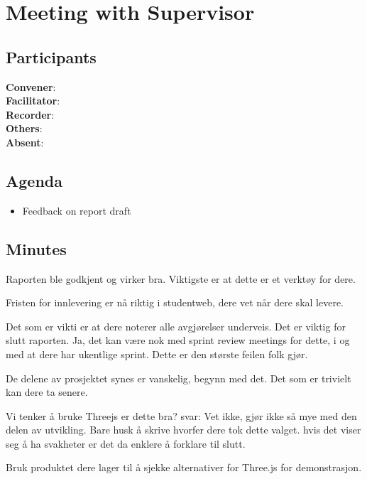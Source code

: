 \section*{Meeting with Supervisor}

\subsection*{Participants}

\textbf{Convener}: \supervisor{}\\
\textbf{Facilitator}: \facilitator{}  \\
\textbf{Recorder}: \scrummaster{}  \\
\textbf{Others}: \groupleader{}                          \\
\textbf{Absent}: 

\subsection*{Agenda}
\begin{itemize}
    \item Feedback on report draft

\end{itemize}

\subsection*{Minutes}
Raporten ble godkjent og virker bra.
Viktigste er at dette  er et verktøy for dere.

Fristen for innlevering er nå riktig i studentweb, dere vet når dere skal levere.


Det som er vikti er at dere noterer alle avgjørelser underveis. Det er viktig for slutt raporten. Ja, det kan være nok med sprint review meetings for dette, i og med at dere har ukentlige sprint. Dette er den største feilen folk gjør. 


De delene av prosjektet synes er vanskelig, begynn med det. Det som er trivielt kan dere ta senere. 

Vi tenker å bruke Threejs er dette bra?
svar: Vet ikke, gjør ikke så mye med den delen av utvikling. Bare husk å skrive hvorfer dere tok dette valget. hvis det viser seg å ha svakheter er det da enklere å forklare til slutt.

Bruk produktet dere lager til å sjekke alternativer for Three.js for demonstrasjon.

\newpage